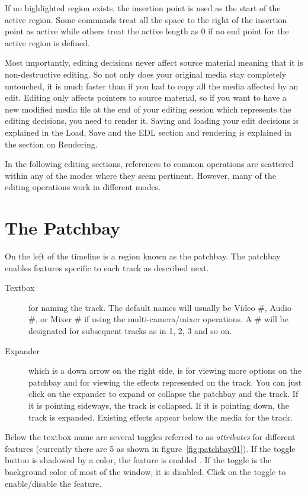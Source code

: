  If no highlighted region exists, the insertion point is used as the start of the active region.  Some commands treat all the space to the right of the insertion point as active while others treat the active length as 0 if no end point for the active region is defined.

Most importantly, editing decisions never affect source material meaning that it is non-destructive editing.  So not only does your original media stay completely untouched, it is much faster than if you had to copy all the media affected by an edit.  Editing only affects pointers to source material, so if you want to have a new modified media file at the end of your editing session which represents the editing decisions, you need to render it.  Saving and loading your edit decisions is explained in the Load, Save and the EDL section and rendering is explained in the section on Rendering.

In the following editing sections, references to common operations are scattered within any of the modes where they seem pertinent.  However, many of the editing operations work in different modes.

\section{The Patchbay}%
\label{sec:patchbay}

On the left of the timeline is a region known as the patchbay.  The patchbay enables features specific to each track as described next.


\begin{description}
    \item[Textbox] for naming the track.  The default names will usually be Video \#, Audio \#, or Mixer \# if using the multi-camera/mixer operations.  A \# will be designated for subsequent tracks as in 1, 2, 3 and so on.
    \item[Expander] which is a down arrow on the right side, is for viewing more options on the patchbay and for viewing the effects represented on the track.   You can just click on the expander to expand or collapse the patchbay and the track.  If it is pointing sideways, the track is collapsed.  If it is pointing down, the track is expanded.  Existing effects appear below the media for the track.
\end{description}

\noindent Below the textbox name are several toggles referred to as \textit{attributes} for different features (currently there are 5 as shown in figure~\ref{fig:patchbay01}).  If the toggle button is shadowed by a color, the feature is enabled . If the toggle is the background color of most of the window, it is disabled. Click 
on the toggle to enable/disable the feature.

